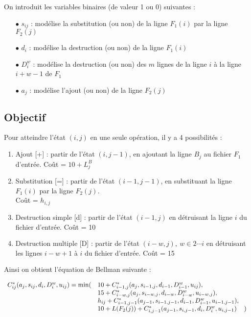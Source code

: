 \documentclass[a4paper, 10pt, french]{article}
\begin{document}
On introduit les variables binaires (de valeur 1 ou 0) suivantes :
\\

\begin{itemize}
\item[$\bullet$]
$s_{ij}$ : modélise la substitution (ou non) de la ligne $F_1(i)$ par la ligne $F_2(j)$
\\
\item[$\bullet$]
$d_i$ : modélise la destruction (ou non) de la ligne $F_1(i)$
\\
\item[$\bullet$]
$D_i^w$ : modélise la destruction (ou non) des $m$ lignes de la ligne $i$ à la ligne $i+w-1$ de $F_1$
\\
\item[$\bullet$]
$a_j$ : modélise l'ajout (ou non) de la ligne $F_2(j)$
\end{itemize}
\vspace{3mm}


\subsection*{Objectif}

Pour atteindre l'état $(i,j)$ en une seule opération, il y a 4 possibilités :
\begin{enumerate}
\item Ajout [+] : partir de l'état $(i,j-1)$, en ajoutant la ligne $B_j$ au fichier $F_1$ d'entrée. Coût = $10 + L_{j}^B$

\item Substitution [=] : partir de l'état $(i-1,j-1)$, en substituant la ligne $F_1(i)$ par la ligne $F_2(j)$.\\
Coût = $h_{i,j}$

\item Destruction simple [d] : partir de l'état $(i-1,j)$ en détruisant la ligne $i$ du fichier d'entrée. Coût = 10

\item Destruction multiple [D] : partir de l'état $(i-w,j),\ w \in 2 \cdots i$ en détruisant les lignes $i-w+1$ à $i$ du fichier d'entrée. Coût = 15
\end{enumerate}
\vspace{3mm}

Ainsi on obtient l'équation de Bellman suivante :

$$\begin{array}{rll}
C^*_{ij}(a_{j},s_{ij},d_{i},D_{i}^w, u_{ij}) = \min (
& 10 + C^*_{i-1,j}(a_{j},s_{i-1,j},d_{i-1},D_{i-1}^w, u_{ij}),\\
& 15 + C^*_{i-w,j}(a_{j},s_{i-w,j},d_{i-w},D_{i-w}^w, u_{i-w,j}),\\
& h_{ij} + C^*_{i-1,j-1}(a_{j-1},s_{i-1,j-1},d_{i-1},D_{i-1}^w, u_{i-1,j-1}),\\
& 10 + L(F_2(j)) + C^*_{i,j-1}(a_{j-1},s_{i,j-1},d_{i},D_{i}^w, u_{i,j-1}) \hspace{4mm} )
\end{array}$$

\end{document}
